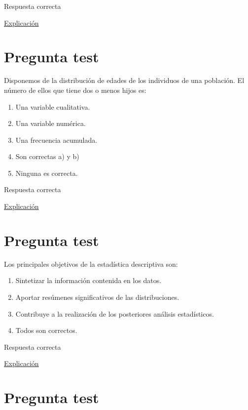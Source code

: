 \documentclass[
]{book}
\providecommand{\tightlist}{%
  \setlength{\itemsep}{0pt}\setlength{\parskip}{0pt}}
\begin{document}
Respuesta correcta

\href{https://1fjmanzano.github.io/bioestadistica/tablas-de-frecuencias.html}{Explicación}

\hypertarget{pregunta-test-20}{%
\section{Pregunta test}\label{pregunta-test-20}}

Disponemos de la distribución de edades de los individuos de una población. El número de ellos que tiene dos o menos hijos es:

\begin{enumerate}
\def\labelenumi{\alph{enumi})}
\tightlist
\item
  Una variable cualitativa.
\item
  Una variable numérica.
\item
  Una frecuencia acumulada.
\item
  Son correctas a) y b)
\item
  Ninguna es correcta.
\end{enumerate}

Respuesta correcta

\href{https://1fjmanzano.github.io/bioestadistica/tablas-de-frecuencias.html}{Explicación}

\hypertarget{pregunta-test-21}{%
\section{Pregunta test}\label{pregunta-test-21}}

Los principales objetivos de la estadística descriptiva son:

\begin{enumerate}
\def\labelenumi{\alph{enumi})}
\tightlist
\item
  Sintetizar la información contenida en los datos.
\item
  Aportar resúmenes significativos de las distribuciones.
\item
  Contribuye a la realización de los posteriores análisis estadísticos.
\item
  Todos son correctos.
\end{enumerate}

Respuesta correcta

\href{https://1fjmanzano.github.io/bioestadistica/an\%C3\%A1lisis-exploratorio-de-datos.html}{Explicación}

\hypertarget{pregunta-test-22}{%
\section{Pregunta test}\label{pregunta-test-22}}
\end{document}
